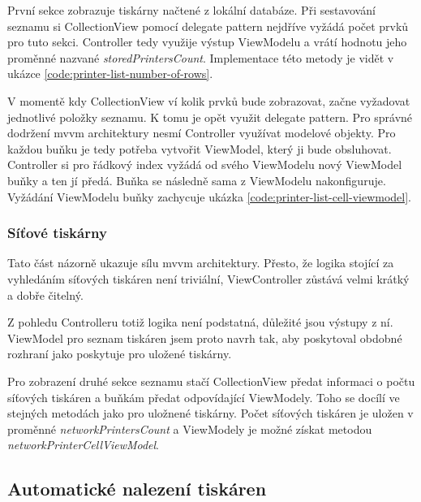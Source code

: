 První sekce zobrazuje tiskárny načtené z lokální databáze.
Při sestavování seznamu si CollectionView pomocí delegate pattern nejdříve vyžádá počet prvků pro tuto sekci.
Controller tedy využije výstup ViewModelu a vrátí hodnotu jeho proměnné nazvané \textit{storedPrintersCount}.
Implementace této metody je vidět v ukázce \ref{code:printer-list-number-of-rows}.


V momentě kdy CollectionView ví kolik prvků bude zobrazovat, začne vyžadovat jednotlivé položky seznamu.
K tomu je opět využit delegate pattern.
Pro správné dodržení \acrshort{mvvm} architektury nesmí Controller využívat modelové objekty.
Pro každou buňku je tedy potřeba vytvořit ViewModel, který ji bude obsluhovat.
Controller si pro řádkový index vyžádá od svého ViewModelu nový ViewModel buňky a ten jí předá.
Buňka se následně sama z ViewModelu nakonfiguruje.
Vyžádání ViewModelu buňky zachycuje ukázka \ref{code:printer-list-cell-viewmodel}.


\subsubsection*{Síťové tiskárny}

Tato část názorně ukazuje sílu \acrshort{mvvm} architektury.
Přesto, že logika stojící za vyhledáním síťových tiskáren není triviální, ViewController zůstává velmi krátký a dobře čitelný.

Z pohledu Controlleru totiž logika není podstatná, důležité jsou výstupy z ní.
ViewModel pro seznam tiskáren jsem proto navrh tak, aby poskytoval obdobné rozhraní jako poskytuje pro uložené tiskárny.

Pro zobrazení druhé sekce seznamu stačí CollectionView předat informaci o počtu síťových tiskáren a buňkám předat odpovídající ViewModely.
Toho se docílí ve stejných metodách jako pro uložnené tiskárny.
Počet síťových tiskáren je uložen v proměnné \textit{networkPrintersCount} a ViewModely je možné získat metodou \textit{networkPrinterCellViewModel}.

\subsection{Automatické nalezení tiskáren}

